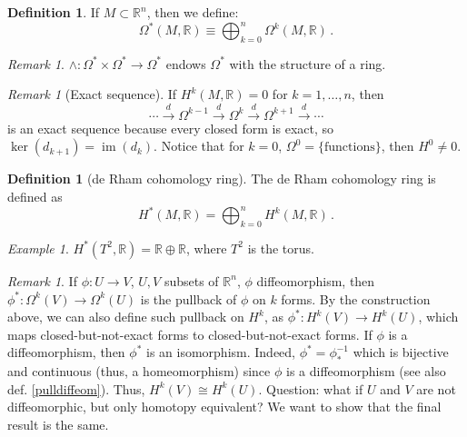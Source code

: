 \documentclass[a4paper,11pt,titlepage, article, oneside]{memoir}
\numberwithin{equation}{section}
\theoremstyle{definition}
\newtheorem{definition}[theorem]{Definition}
\theoremstyle{remark}
\newtheorem{remark}[theorem]{Remark}
\newtheorem{example}[theorem]{Example}
\DeclareMathOperator{\im}{im}
\newcommand{\rfield}{\mathbb{R}}
\begin{document}
\begin{definition}
  If $M \subset \rfield^n$, then we define:
  \[  \Omega^*(M, \rfield) \equiv \bigoplus_{k=0}^n \Omega^k(M, \rfield) \, . \]
\end{definition}

\begin{remarkbox}\begin{remark}
  $\wedge \colon \Omega^* \times \Omega^* \rightarrow \Omega^*$ endows $\Omega^*$ with the structure of a ring.
\end{remark}\end{remarkbox}

\begin{remarkbox}\begin{remark} [Exact sequence] \label{exsequence}
  If $H^k(M, \rfield) = 0$ for $k=1, \ldots, n$, then
    $$\cdots \overset{d}{\longrightarrow} \Omega^{k-1} \overset{d}{\longrightarrow} \Omega^{k} \overset{d}{\longrightarrow} \Omega^{k+1} \overset{d}{\longrightarrow} \cdots $$
    is an exact sequence because every closed form is exact, so $\ker(d_{k+1}) = \im(d_k)$. Notice that for $k=0$, $\Omega^0 = \{\text{functions}\}$, then $H^0 \ne 0$.
\end{remark} \end{remarkbox}

\begin{definition}[de Rham cohomology ring]
  The de Rham cohomology ring is defined as
  \[ H^*(M, \rfield) = \bigoplus_{k=0}^n H^k(M, \rfield) \, .\]
\end{definition}

\begin{tcolorbox}\begin{example}
  $H^*(T^2, \rfield) = \rfield \oplus \rfield$, where $T^2$ is the torus.
\end{example}\end{tcolorbox}

\begin{remarkbox}\begin{remark}
  If $\phi \colon U \rightarrow V$, $U, V$ subsets of $\rfield^n$, $\phi$ diffeomorphism, then $\phi^* \colon \Omega^k(V) \rightarrow \Omega^k(U)$ is the pullback of $\phi$ on $k$ forms. By the construction above, we can also define such pullback on $H^k$, as $\phi^* \colon H^k(V) \rightarrow H^k(U)$, which maps closed-but-not-exact forms to closed-but-not-exact forms.
  If $\phi$ is a diffeomorphism, then $\phi^*$ is an isomorphism. Indeed, $\phi^* = \phi_*^{-1}$ which is bijective and continuous (thus, a homeomorphism) since $\phi$ is a diffeomorphism (see also def. \ref{pulldiffeom}). Thus, $H^k(V) \cong H^k(U)$.
  Question: what if $U$ and $V$ are not diffeomorphic, but only homotopy equivalent? We want to show that the final result is the same.
 \end{remark}\end{remarkbox}
\end{document}
